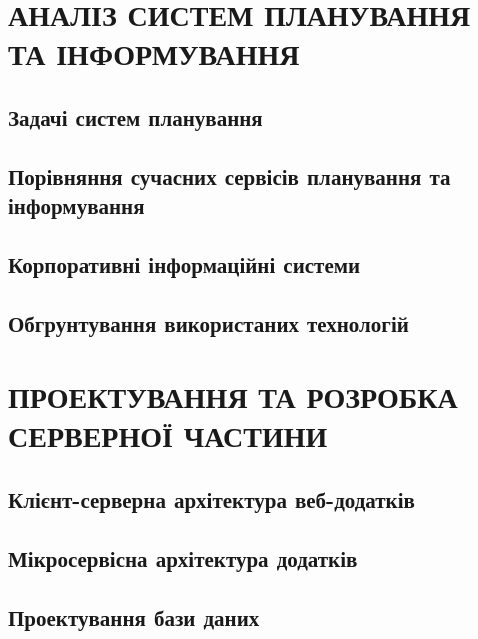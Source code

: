 \documentclass[a4paper,14pt]{extarticle} %
\begin{document}

\tableofcontents %
\clearpage


\section{АНАЛІЗ СИСТЕМ ПЛАНУВАННЯ ТА ІНФОРМУВАННЯ}
\subsection{Задачі систем планування} 

\subsection{Порівняння сучасних сервісів планування та інформування} 




\subsection{Корпоративні інформаційні системи} 



\subsection{Обгрунтування використаних технологій} 






\section{ПРОЕКТУВАННЯ ТА РОЗРОБКА СЕРВЕРНОЇ ЧАСТИНИ}

\subsection{Клієнт-серверна архітектура веб-додатків} 

\subsection{Мікросервісна архітектура додатків} 

\subsection{Проектування бази даних}





\end{document}
